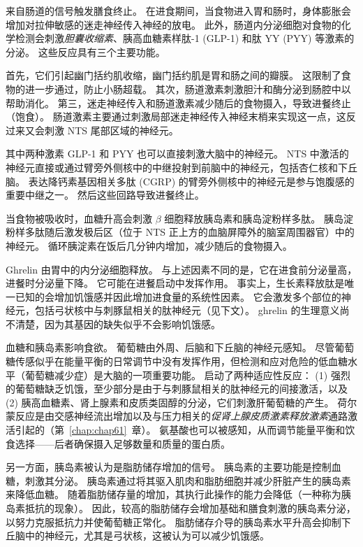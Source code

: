 来自肠道的信号触发膳食终止。
在进食期间，当食物进入胃和肠时，身体膨胀会增加对拉伸敏感的迷走神经传入神经的放电。
此外，肠道内分泌细胞对食物的化学检测会刺激\textit{胆囊收缩素}、胰高血糖素样肽-1 (GLP-1) 和肽 YY (PYY) 等激素的分泌。
这些反应具有三个主要功能。


首先，它们引起幽门括约肌收缩，幽门括约肌是胃和肠之间的瓣膜。
这限制了食物的进一步通过，防止小肠超载。
其次，肠道激素刺激胆汁和酶分泌到肠腔中以帮助消化。
第三，迷走神经传入和肠道激素减少随后的食物摄入，导致进餐终止（饱食）。
肠道激素主要通过刺激局部迷走神经传入神经末梢来实现这一点，这反过来又会刺激 NTS 尾部区域的神经元。


其中两种激素 GLP-1 和 PYY 也可以直接刺激大脑中的神经元。
NTS 中激活的神经元直接或通过臂旁外侧核中的中继投射到前脑中的神经元，包括杏仁核和下丘脑。
表达降钙素基因相关多肽 (CGRP) 的臂旁外侧核中的神经元是参与饱腹感的重要中继之一。
然后这些回路导致进餐终止。


当食物被吸收时，血糖升高会刺激 $ \beta $ 细胞释放胰岛素和胰岛淀粉样多肽。
胰岛淀粉样多肽随后激发极后区（位于 NTS 正上方的血脑屏障外的脑室周围器官）中的神经元。
循环胰淀素在饭后几分钟内增加，减少随后的食物摄入。


Ghrelin 由胃中的内分泌细胞释放。
与上述因素不同的是，它在进食前分泌量高，进餐时分泌量下降。
它可能在进餐启动中发挥作用。
事实上，生长素释放肽是唯一已知的会增加饥饿感并因此增加进食量的系统性因素。
它会激发多个部位的神经元，包括弓状核中与刺豚鼠相关的肽神经元（见下文）。
ghrelin 的生理意义尚不清楚，因为其基因的缺失似乎不会影响饥饿感。


血糖和胰岛素影响食欲。
葡萄糖由外周、后脑和下丘脑的神经元感知。
尽管葡萄糖传感似乎在能量平衡的日常调节中没有发挥作用，但检测和应对危险的低血糖水平（葡萄糖减少症）是大脑的一项重要功能。
启动了两种适应性反应：
(1) 强烈的葡萄糖缺乏饥饿，至少部分是由于与刺豚鼠相关的肽神经元的间接激活，以及 (2) 胰高血糖素、肾上腺素和皮质类固醇的分泌，它们刺激肝葡萄糖的产生。
荷尔蒙反应是由交感神经流出增加以及与压力相关的\textit{促肾上腺皮质激素释放激素}通路激活引起的（第~\ref{chap:chap61}~章）。
氨基酸也可以被感知，从而调节能量平衡和饮食选择——后者确保摄入足够数量和质量的蛋白质。


另一方面，胰岛素被认为是脂肪储存增加的信号。
胰岛素的主要功能是控制血糖，刺激其分泌。
胰岛素通过将其驱入肌肉和脂肪细胞并减少肝脏产生的胰岛素来降低血糖。
随着脂肪储存量的增加，其执行此操作的能力会降低（一种称为胰岛素抵抗的现象）。
因此，较高的脂肪储存会增加基础和膳食刺激的胰岛素分泌，以努力克服抵抗力并使葡萄糖正常化。
脂肪储存介导的胰岛素水平升高会抑制下丘脑中的神经元，尤其是弓状核，这被认为可以减少饥饿感。


